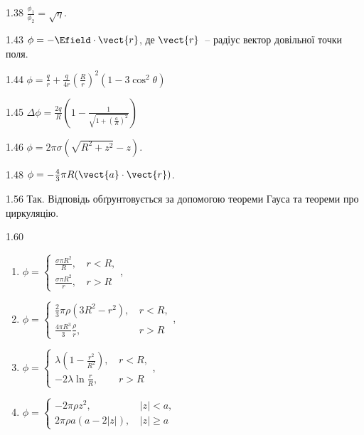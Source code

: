 \begin{Solution}{1.{38}}
	$\frac{\phi_1}{\phi_2} =\sqrt\eta$.
\end{Solution}
\begin{Solution}{1.{43}}
	$\phi = -\Efield\cdot\vect{r}$, де $\vect{r}$~-- радіус вектор довільної точки поля.
\end{Solution}
\begin{Solution}{1.{44}}
	$\phi = \frac{q}{r} + \frac{q}{4r}\left(\frac{R}{r} \right)^2(1-3\cos^2\theta) $
\end{Solution}
\begin{Solution}{1.{45}}
	$\Delta\phi = \frac{2q}{R}\left(1 - \frac{1}{\sqrt{1 + \left(\frac{a}{R} \right)^2}}\right)$
\end{Solution}
\begin{Solution}{1.{46}}
	$\phi = 2\pi\sigma  \left( \sqrt{R^2 + z^2} - z \right) $.
\end{Solution}
\begin{Solution}{1.{48}}
	$\phi = -\frac43\pi R (\vect{a}\cdot\vect{r})$.
\end{Solution}
\begin{Solution}{1.{56}}
	Так. Відповідь обґрунтовується за допомогою теореми Гауса та теореми про циркуляцію.
\end{Solution}
\begin{Solution}{1.{60}}
	\begin{enumerate}[label=\alph*)]
		\item $\phi =
		      \begin{cases}
			  \frac{\sigma \pi R^2}{R}, \,    & r < R, \\
			  \frac{\sigma \pi R^2}{r}, \, & r > R
			  \end{cases}
			  $,
		\item $\phi =
			      \begin{cases}
				      \frac23 \pi \rho (3R^2 - r^2), \,    & r < R, \\
				      \frac{4\pi R^3}{3}\frac{\rho}{r}, \, & r > R
			      \end{cases}
		      $,
		\item $\phi =
			      \begin{cases}
				      \lambda \left(1- \frac{r^2}{R^2} \right) ,\, & r < R, \\
				      -2\lambda\ln\frac{r}{R}, \,                  & r > R
			      \end{cases}
		      $,
		\item $\phi =
			      \begin{cases}
				      -2\pi\rho z^2, \,                      & \left| z\right| < a,  \\
				      2\pi\rho a (a - 2\left| z\right| ), \, & \left| z\right| \ge a
			      \end{cases}
		      $
	\end{enumerate}
\end{Solution}
